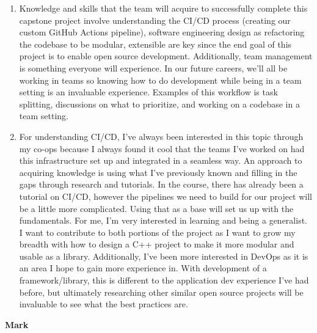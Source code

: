 \documentclass[12pt]{article}
\begin{document}
\begin{enumerate}

  \item Knowledge and skills that the team will acquire to successfully complete this capstone project involve understanding the CI/CD process (creating our custom GitHub Actions pipeline), software engineering design as refactoring the codebase to be modular, extensible are key since the end goal of this project is to enable open source development. Additionally, team management is something everyone will experience. In our future careers, we’ll all be working in teams so knowing how to do development while being in a team setting is an invaluable experience. Examples of this workflow is task splitting, discussions on what to prioritize, and working on a codebase in a team setting.

  
  \item For understanding CI/CD, I’ve always been interested in this topic through my co-ops because I always found it cool that the teams I’ve worked on had this infrastructure set up and integrated in a seamless way. An approach to acquiring knowledge is using what I’ve previously known and filling in the gaps through research and tutorials. In the course, there has already been a tutorial on CI/CD, however the pipelines we need to build for our project will be a little more complicated. Using that as a base will set us up with the fundamentals. For me, I’m very interested in learning and being a generalist. I want to contribute to both portions of the project as I want to grow my breadth with how to design a C++ project to make it more modular and usable as a library. Additionally, I’ve been more interested in DevOps as it is an area I hope to gain more experience in. With development of a framework/library, this is different to the application dev experience I’ve had before, but ultimately researching other similar open source projects will be invaluable to see what the best practices are.
  
  \end{enumerate}


\textbf{Mark}
\end{document}
